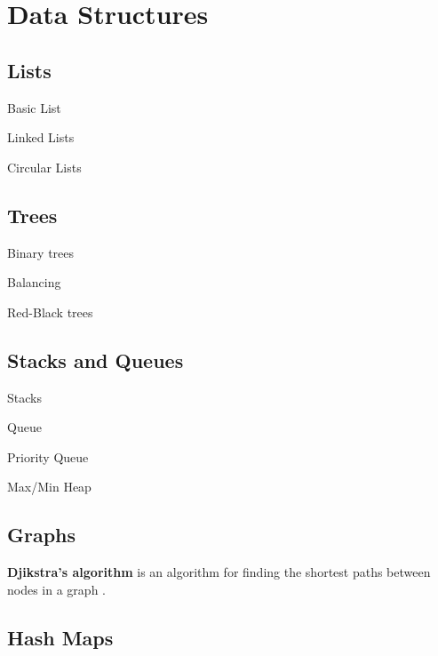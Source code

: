 \section{Data Structures}

\subsection{Lists}

Basic List 

Linked Lists

Circular Lists

\subsection{Trees}

Binary trees

Balancing

Red-Black trees

\subsection{Stacks and Queues}

Stacks

Queue

Priority Queue

Max/Min Heap

\subsection{Graphs}

\textbf{Djikstra's algorithm} is an algorithm for finding the shortest paths between nodes in a graph \cite{DijkstraAlgorithm}.

\subsection{Hash Maps}

